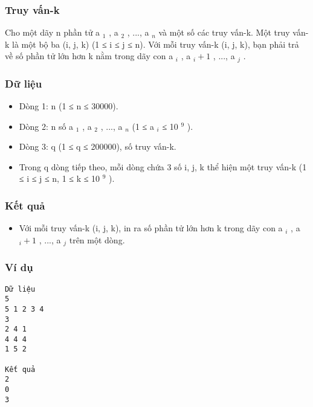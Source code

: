 



\subsubsection{   Truy vấn-k  }

   Cho một dãy n phần tử a   $_    1   $   ,   a   $_    2   $   , ..., a   $_    n   $   và một số các truy vấn-k. Một truy vấn-k là một bộ ba (i, j, k) (1 ≤ i ≤ j ≤ n). Với mỗi truy vấn-k (i, j, k), bạn phải trả về số phần tử lớn hơn k nằm trong dãy con a   $_    i   $   ,   a   $_    i+1   $   , ..., a   $_    j   $   .  

\subsubsection{   Dữ liệu  }
\begin{itemize}
	\item     Dòng 1: n (1 ≤ n ≤ 30000).   
	\item     Dòng 2: n số a    $_     1    $    , a    $_     2    $    , ...,   a    $_     n    $    (1 ≤ a    $_     i    $    ≤   10    $^     9    $    ).   
	\item     Dòng 3: q (1 ≤ q ≤ 200000), số truy vấn-k.   
	\item     Trong q dòng tiếp theo, mỗi dòng chứa 3 số i, j, k   thể hiện một truy vấn-k (1 ≤ i ≤ j ≤ n, 1 ≤ k ≤   10    $^     9    $    ).   
\end{itemize}

\subsubsection{   Kết quả  }
\begin{itemize}
	\item     Với mỗi truy vấn-k (i, j, k), in ra số phần tử lớn hơn k trong dãy con a    $_     i    $    ,   a    $_     i+1    $    , ..., a    $_     j    $    trên một dòng.    


\end{itemize}

\subsubsection{   Ví dụ  }
\begin{verbatim}
Dữ liệu
5
5 1 2 3 4
3
2 4 1
4 4 4
1 5 2 

Kết quả
2
0
3 
\end{verbatim}
